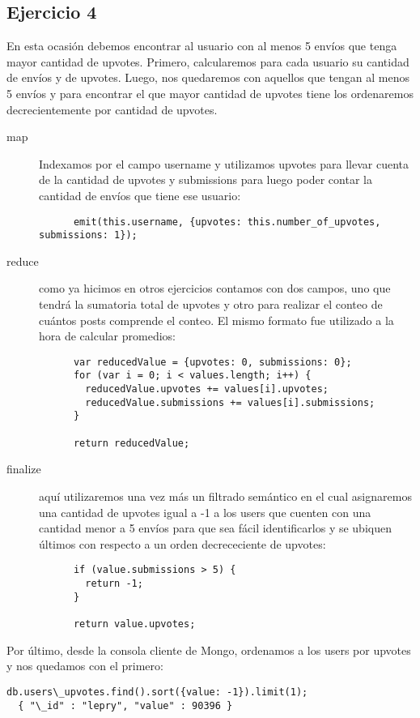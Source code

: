 \subsection{Ejercicio 4}
En esta ocasión debemos encontrar al usuario con al menos 5 envíos que
tenga mayor cantidad de upvotes. Primero, calcularemos para cada usuario
su cantidad de envíos y de upvotes. Luego, nos quedaremos con aquellos
que tengan al menos 5 envíos y para encontrar el que mayor cantidad de
upvotes tiene los ordenaremos decrecientemente por cantidad de upvotes.
\begin{description}
  \item[map] Indexamos por el campo username y utilizamos upvotes para 
    llevar cuenta de la cantidad de upvotes y submissions para luego poder
    contar la cantidad de envíos que tiene ese usuario:
    \begin{lstlisting}
      emit(this.username, {upvotes: this.number_of_upvotes, submissions: 1});
    \end{lstlisting}
  \item[reduce] como ya hicimos en otros ejercicios contamos con dos campos,
    uno que tendrá la sumatoria total de upvotes y otro para realizar
    el conteo de cuántos posts comprende el conteo. El mismo formato fue
    utilizado a la hora de calcular promedios:
    \begin{lstlisting}
      var reducedValue = {upvotes: 0, submissions: 0};
      for (var i = 0; i < values.length; i++) {
        reducedValue.upvotes += values[i].upvotes; 
        reducedValue.submissions += values[i].submissions; 
      }

      return reducedValue;
    \end{lstlisting}
  \item[finalize] aquí utilizaremos una vez más un filtrado semántico en el
    cual asignaremos una cantidad de upvotes igual a -1 a los users que
    cuenten con una cantidad menor a 5 envíos para que sea fácil 
    identificarlos y se ubiquen últimos con respecto a un orden decrececiente
    de upvotes:
    \begin{lstlisting}
      if (value.submissions > 5) {
        return -1;
      }

      return value.upvotes;
    \end{lstlisting}
\end{description}
Por último, desde la consola cliente de Mongo, ordenamos a los users por
upvotes y nos quedamos con el primero:
\begin{lstlisting}
db.users\_upvotes.find().sort({value: -1}).limit(1);
  { "\_id" : "lepry", "value" : 90396 }
\end{lstlisting}

